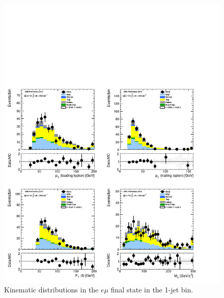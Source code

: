 \begin{figure}[!hbtp]
\centering
\includegraphics[width=1\textwidth]{figures/ww_analysis20_0_ALL_em_1j.pdf}
\caption{Kinematic distributions in the $e\mu$ final state in the 1-jet bin.}
\label{fig:xs_kinematics_em_1j}
\end{figure}
